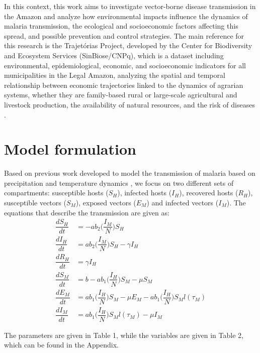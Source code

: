 \documentclass[3p,times]{elsarticle}
\begin{document}
In this context, this work aims to investigate vector-borne disease 
transmission in the Amazon and analyze how environmental impacts 
influence the dynamics of malaria transmission, the ecological and 
socioeconomic factors affecting this spread, and possible prevention 
and control strategies. The main reference for this research is the 
Trajetórias Project, developed by the Center for Biodiversity and 
Ecosystem Services (SinBiose/CNPq), which is a dataset including 
environmental, epidemiological, economic, and socioeconomic indicators 
for all municipalities in the Legal Amazon, analyzing the spatial and 
temporal relationship between economic trajectories linked to the dynamics 
of agrarian systems, whether they are family-based rural or large-scale 
agricultural and livestock production, the availability of natural resources, 
and the risk of diseases \cite{Rorato2023}.

\section{Model formulation}
\label{}
Based on previous work developed to model the transmission of malaria based on precipitation and temperature dynamics \cite{Parham2010}, we focus on two different sets of compartments: susceptible hosts ($S_H$), infected hosts ($I_H$), recovered hosts ($R_H$), susceptible vectors ($S_M$), exposed vectors ($E_M$) and infected vectors ($I_M$). The equations that describe the transmission are given as:
\begin{align}
\dfrac{dS_H}{dt} & = -ab_2\bigg(\dfrac{I_M}{N}\bigg)S_H \label{eq1}\\
\dfrac{dI_H}{dt} & = ab_2\bigg(\dfrac{I_M}{N}\bigg)S_H - \gamma I_H \label{eq2}\\
\dfrac{dR_H}{dt} & = \gamma I_H \label{eq3}\\
\dfrac{dS_M}{dt} & = b - ab_1\bigg(\dfrac{I_H}{N}\bigg)S_M - \mu S_M \label{eq4}\\
\dfrac{dE_M}{dt} & = ab_1\bigg(\dfrac{I_H}{N}\bigg)S_M - \mu E_M - ab_1\bigg(\dfrac{I_H}{N}\bigg)S_Ml(\tau_M) \label{eq5}\\
\dfrac{dI_M}{dt} & = ab_1\bigg(\dfrac{I_H}{N}\bigg)S_Ml(\tau_M) - \mu I_M \label{eq6}
\end{align}

The parameters are given in Table 1, while the variables are given in Table 2, which can be found in the Appendix.
\end{document}
